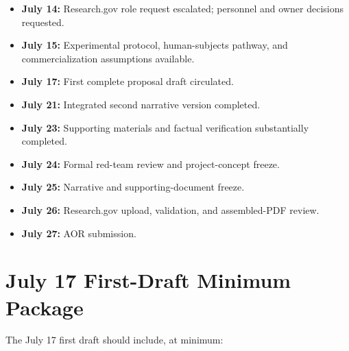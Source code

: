 \documentclass[11pt,letterpaper]{article}
\begin{document}
\begin{itemize}[leftmargin=0.25in]
    \item \textbf{July 14:} Research.gov role request escalated; personnel and
    owner decisions requested.
    
    \item \textbf{July 15:} Experimental protocol, human-subjects pathway, and
    commercialization assumptions available.
    
    \item \textbf{July 17:} First complete proposal draft circulated.
    
    \item \textbf{July 21:} Integrated second narrative version completed.
    
    \item \textbf{July 23:} Supporting materials and factual verification
    substantially completed.
    
    \item \textbf{July 24:} Formal red-team review and project-concept freeze.
    
    \item \textbf{July 25:} Narrative and supporting-document freeze.
    
    \item \textbf{July 26:} Research.gov upload, validation, and assembled-PDF
    review.
    
    \item \textbf{July 27:} AOR submission.
\end{itemize}

\section{July 17 First-Draft Minimum Package}

The July 17 first draft should include, at minimum:
\end{document}
